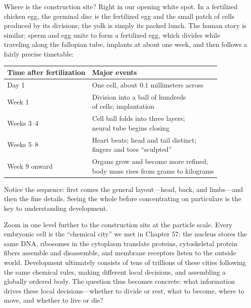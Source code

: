 Where is the construction site? Right in our opening white spot. In a fertilized chicken egg, the germinal disc is the fertilized egg and the small patch of cells produced by its divisions; the yolk is simply its packed lunch. The human story is similar: sperm and egg unite to form a fertilized egg, which divides while traveling along the fallopian tube, implants at about one week, and then follows a fairly precise timetable:

\begin{table}[htbp]
\centering
\begin{tabular}{ll}
\toprule
Time after fertilization & Major events \\
\midrule
Day 1 & One cell, about $0.1$ millimeters across \\
Week 1 & \shortstack[l]{Division into a ball of hundreds\\of cells; implantation} \\
Weeks 3--4 & \shortstack[l]{Cell ball folds into three layers;\\neural tube begins closing} \\
Weeks 5--8 & \shortstack[l]{Heart beats; head and tail distinct;\\fingers and toes ``sculpted''} \\
Week 9 onward & \shortstack[l]{Organs grow and become more refined;\\body mass rises from grams to kilograms} \\
\bottomrule
\end{tabular}
\end{table}

Notice the sequence: first comes the general layout---head, back, and limbs---and then the fine details. Seeing the whole before concentrating on particulars is the key to understanding development.

Zoom in one level further to the construction site at the particle scale. Every embryonic cell is the ``chemical city'' we met in Chapter 57: the nucleus stores the same DNA, ribosomes in the cytoplasm translate proteins, cytoskeletal protein fibers assemble and disassemble, and membrane receptors listen to the outside world. Development ultimately consists of tens of trillions of these cities following the same chemical rules, making different local decisions, and assembling a globally ordered body. The question thus becomes concrete: what information drives these local decisions---whether to divide or rest, what to become, where to move, and whether to live or die?

